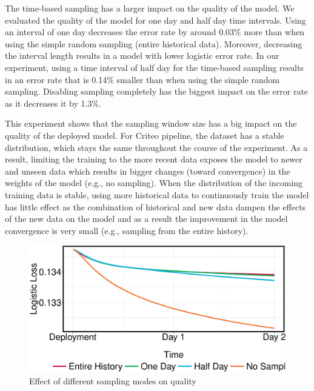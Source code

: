 The time-based sampling has a larger impact on the quality of the model.
We evaluated the quality of the model for one day and half day time intervals.
Using an interval of one day decreases the error rate by around 0.03\% more than when using the simple random sampling (entire historical data).
Moreover, decreasing the interval length results in a model with lower logistic error rate.
In our experiment, using a time interval of half day for the time-based sampling results in an error rate that is 0.14\% smaller than when using the simple random sampling. 
Disabling sampling completely has the biggest impact on the error rate as it decreases it by 1.3\%.

This experiment shows that the sampling window size has a big impact on the quality of the deployed model.
For Criteo pipeline, the dataset has a stable distribution, which stays the same throughout the course of the experiment.
As a result, limiting the training to the more recent data exposes the model to newer and unseen data which results in bigger changes (toward convergence) in the weights of the model (e.g., no sampling).
When the distribution of the incoming training data is stable, using more historical data to continuously train the model has little effect as the combination of historical and new data dampen the effects of the new data on the model and as a result the improvement in the model convergence is very small (e.g., sampling from the entire history).


\begin{figure}[h!]
\centering
\includegraphics[width=\columnwidth]{../images/experiment-results/criteo-sampling-mode-experiments.eps}
\caption{Effect of different sampling modes on quality}
\label{fig:sampling-mode-quality}
\vspace{2mm}
\end{figure}

